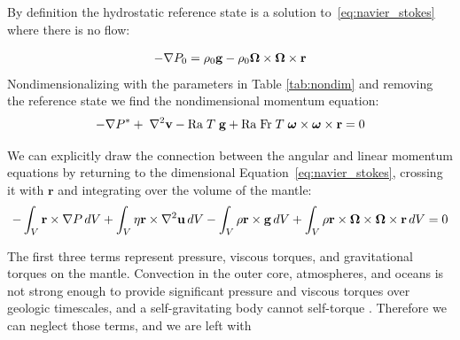 \documentclass[extra,mreferee]{gji}
\begin{document}
By definition the hydrostatic reference state is a solution to~\eqref{eq:navier_stokes} where there is no flow:

\begin{equation}
\begin{aligned}
- \nabla P_0 =  \rho_0 \mathbf{g} -  \rho_0 \mitbf{\Omega} \times \mitbf{\Omega} \times \mathbf{r}
\label{eq:hydrostatic}
\end{aligned}
\end{equation}
Nondimensionalizing with the parameters in Table \ref{tab:nondim} and removing the reference state we find the nondimensional momentum equation:
\begin{equation}
\begin{aligned}
 - \nabla P^* + \; \nabla^2 \mathbf{v} - \mathrm{Ra} \; T \; \mathbf{g} + \mathrm{Ra \; Fr}\; T \;{\mitbf{\omega} \times \mitbf{\omega} \times \mathbf{r}} = 0
\end{aligned}
\end{equation}

We can explicitly draw the connection between the angular and linear momentum equations by returning to the dimensional
Equation~\eqref{eq:navier_stokes}, crossing it with $\mathbf{r}$ and integrating over the volume of the mantle:
\begin{equation}
\begin{aligned}
-\int_V \mathbf{r} \times \nabla P \,dV + \int_V \eta \mathbf{r} \times \nabla^2 \mathbf{u} \,dV - \int_V \rho \mathbf{r} \times \mathbf{g} \,dV 
   + \int_V \rho \mathbf{r} \times \mitbf{\Omega} \times \mitbf{\Omega} \times \mathbf{r}  \,dV &= 0 \\
\end{aligned}
\end{equation}


The first three terms represent pressure, viscous torques, and gravitational torques on the mantle.  
Convection in the outer core, atmospheres, and oceans is not strong enough to provide significant pressure and viscous torques over geologic timescales, and a self-gravitating body cannot self-torque \citep{braginsky1995equations}.
Therefore we can neglect those terms, and we are left with
\end{document}
